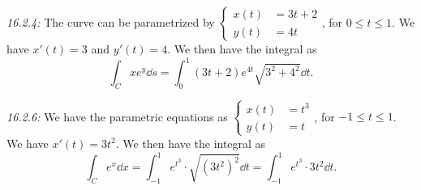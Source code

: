 \documentclass[8pt]{article}
\begin{document}
\begin{Answer}[number=28]
  \emph{16.2.4:} The curve can be parametrized by \(\begin{cases}
    x(t) &= 3t+2\\
    y(t) &= 4t
  \end{cases}\), for $0\le t\le 1$. We have $x'(t) = 3$ and $y'(t) = 4$.
  We then have the integral as
  \[
    \int_C xe^y\dd{s} = \int_0^1 (3t+2)e^{4t}\sqrt{3^2+4^2}\dd{t}.
  \]

  \emph{16.2.6:} We have the parametric equations as \(\begin{cases}
    x(t) &= t^3\\
    y(t) &= t
  \end{cases}\), for $-1\le t\le 1$. We have $x'(t) = 3t^2$.
  We then have the integral as
  \[
    \int_C e^x\dd{x} = \int_{-1}^1 e^{t^3} \cdot \sqrt{(3t^2)^2}\dd{t}= \int_{-1}^1 e^{t^3} \cdot 3t^2\dd{t}.
  \]
\end{Answer}
\end{document}
